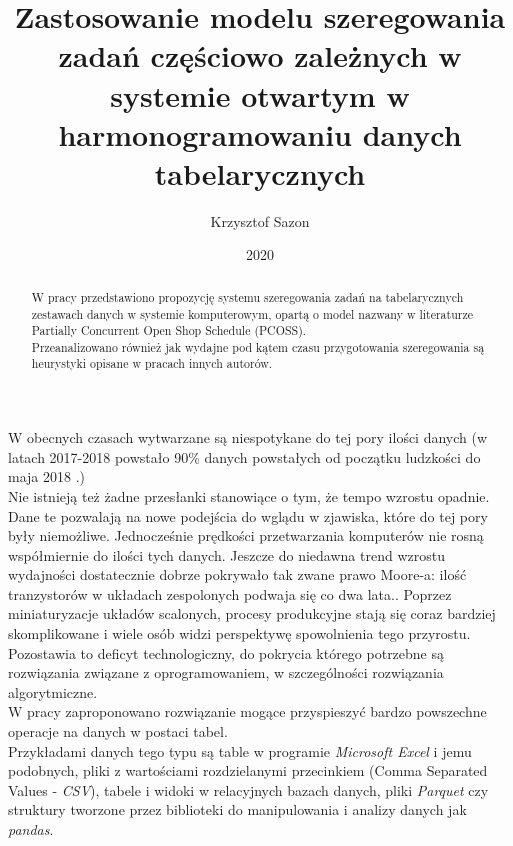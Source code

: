 \documentclass[brudnopis]{xmgr}
\author   {Krzysztof Sazon}
\title    {Zastosowanie modelu szeregowania zadań częściowo zależnych w systemie otwartym w harmonogramowaniu danych tabelarycznych}
\date     {2020}
\begin{document}
\begin{abstract}
W pracy przedstawiono propozycję systemu szeregowania zadań na tabelarycznych zestawach danych w systemie komputerowym, opartą o model nazwany w literaturze Partially Concurrent Open Shop Schedule (PCOSS). \\
Przeanalizowano również jak wydajne pod kątem czasu przygotowania szeregowania są heurystyki opisane w pracach innych autorów. \\
\end{abstract}


\maketitle

\introduction

W obecnych czasach wytwarzane są niespotykane do tej pory ilości danych (w latach 2017-2018 powstało 90\% danych powstałych od początku ludzkości do maja 2018 \cite{Forbes:2018:FBS}.) \\
Nie istnieją też żadne przesłanki stanowiące o tym, że tempo wzrostu opadnie.
Dane te pozwalają na nowe podejścia do wglądu w zjawiska, które do tej pory były niemożliwe.
Jednocześnie prędkości przetwarzania komputerów nie rosną współmiernie do ilości tych danych. Jeszcze do niedawna trend wzrostu wydajności dostatecznie dobrze pokrywało tak zwane prawo Moore-a: ilość tranzystorów w układach zespolonych podwaja się co dwa lata.\cite{MOORE:1965:X}. Poprzez miniaturyzacje układów scalonych, procesy produkcyjne stają się coraz bardziej skomplikowane i wiele osób widzi perspektywę spowolnienia tego przyrostu.\cite{NOTMOORE:2020:X}  Pozostawia to deficyt technologiczny, do pokrycia którego potrzebne są rozwiązania związane z oprogramowaniem, w szczególności rozwiązania algorytmiczne.
\medskip\\

W pracy zaproponowano rozwiązanie mogące przyspieszyć bardzo powszechne operacje na danych w postaci tabel.
\medskip\\

Przykładami danych tego typu są table w programie \emph{Microsoft Excel} i jemu podobnych, pliki z wartościami rozdzielanymi przecinkiem (Comma Separated Values - \emph{CSV}), tabele i widoki w relacyjnych bazach danych, pliki \emph{Parquet} czy struktury tworzone przez biblioteki do manipulowania i analizy danych jak \emph{pandas}.
\end{document}
